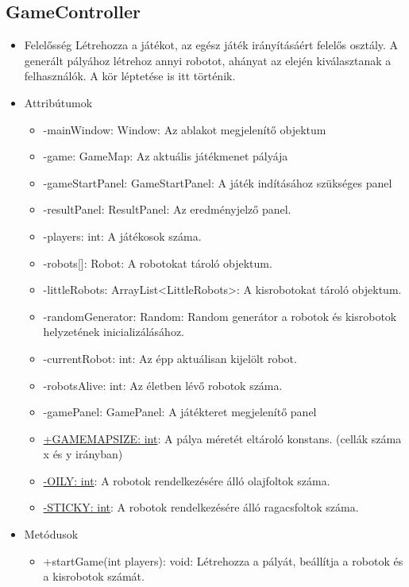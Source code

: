 
\subsection{GameController}
\begin{itemize}
	\item Felelősség\newline
	Létrehozza a játékot, az egész játék irányításáért felelős osztály. A generált pályához létrehoz annyi robotot, ahányat az elején kiválasztanak a felhasználók. A kör léptetése is itt történik.
	
	\item Attribútumok

	\begin{itemize}
		\item -mainWindow: Window: Az ablakot megjelenítő objektum
		\item -game: GameMap: Az aktuális játékmenet pályája
		\item -gameStartPanel: GameStartPanel: A játék indításához szükséges panel
		\item -resultPanel: ResultPanel: Az eredményjelző panel.
		\item -players: int: A játékosok száma.
		\item -robots[]: Robot: A robotokat tároló objektum.
		\item -littleRobots: ArrayList<LittleRobots>: A kisrobotokat tároló objektum. 
		\item -randomGenerator: Random: Random generátor a robotok és kisrobotok helyzetének inicializálásához.
		\item -currentRobot: int: Az épp aktuálisan kijelölt robot.
		\item -robotsAlive: int: Az életben lévő robotok száma.
		\item -gamePanel: GamePanel: A játékteret megjelenítő panel
		\item \underline{+GAMEMAPSIZE: int}: A pálya méretét eltároló konstans. (cellák száma x és y irányban)
		\item \underline{-OILY: int}: A robotok rendelkezésére álló olajfoltok száma.
		\item \underline{-STICKY: int}: A robotok rendelkezésére álló ragacsfoltok száma.
		\end{itemize}
	\item Metódusok
	\begin{itemize}
		\item +startGame(int players): void: Létrehozza a pályát, beállítja a robotok és a kisrobotok számát. 

\end{itemize}
\end{itemize}
